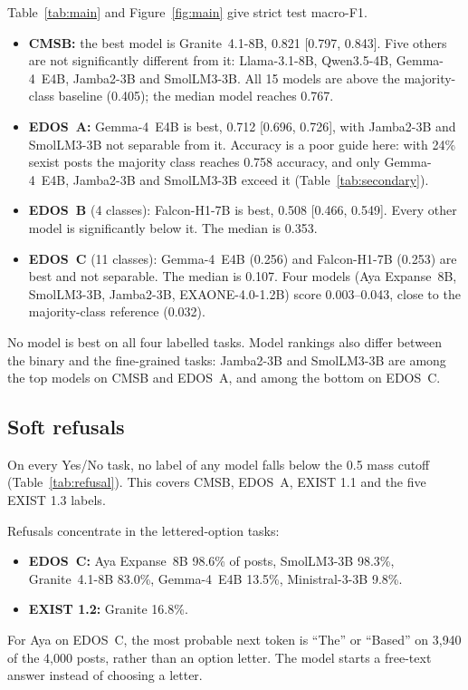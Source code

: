 \documentclass[11pt]{article}
\newcommand{\tbl}[1]{}
\begin{document}
Table~\ref{tab:main} and Figure~\ref{fig:main} give strict test macro-F1.
\begin{itemize}
  \item \textbf{CMSB:} the best model is Granite~4.1-8B, 0.821 [0.797, 0.843]. Five others are not significantly different from it: Llama-3.1-8B, Qwen3.5-4B, Gemma-4~E4B, Jamba2-3B and SmolLM3-3B. All 15 models are above the majority-class baseline (0.405); the median model reaches 0.767.
  \item \textbf{EDOS~A:} Gemma-4~E4B is best, 0.712 [0.696, 0.726], with Jamba2-3B and SmolLM3-3B not separable from it. Accuracy is a poor guide here: with 24\% sexist posts the majority class reaches 0.758 accuracy, and only Gemma-4~E4B, Jamba2-3B and SmolLM3-3B exceed it (Table~\ref{tab:secondary}).
  \item \textbf{EDOS~B} (4 classes): Falcon-H1-7B is best, 0.508 [0.466, 0.549]. Every other model is significantly below it. The median is 0.353.
  \item \textbf{EDOS~C} (11 classes): Gemma-4~E4B (0.256) and Falcon-H1-7B (0.253) are best and not separable. The median is 0.107. Four models (Aya Expanse~8B, SmolLM3-3B, Jamba2-3B, EXAONE-4.0-1.2B) score 0.003--0.043, close to the majority-class reference (0.032).
\end{itemize}
No model is best on all four labelled tasks. Model rankings also differ between the binary and the fine-grained tasks: Jamba2-3B and SmolLM3-3B are among the top models on CMSB and EDOS~A, and among the bottom on EDOS~C.

\subsection{Soft refusals}
\tbl{refusal}

On every Yes/No task, no label of any model falls below the 0.5 mass cutoff (Table~\ref{tab:refusal}). This covers CMSB, EDOS~A, EXIST 1.1 and the five EXIST 1.3 labels.

Refusals concentrate in the lettered-option tasks:
\begin{itemize}
  \item \textbf{EDOS~C:} Aya Expanse~8B 98.6\% of posts, SmolLM3-3B 98.3\%, Granite~4.1-8B 83.0\%, Gemma-4~E4B 13.5\%, Ministral-3-3B 9.8\%.
  \item \textbf{EXIST 1.2:} Granite 16.8\%.
\end{itemize}
For Aya on EDOS~C, the most probable next token is ``The'' or ``Based'' on 3{,}940 of the 4{,}000 posts, rather than an option letter. The model starts a free-text answer instead of choosing a letter.
\end{document}
